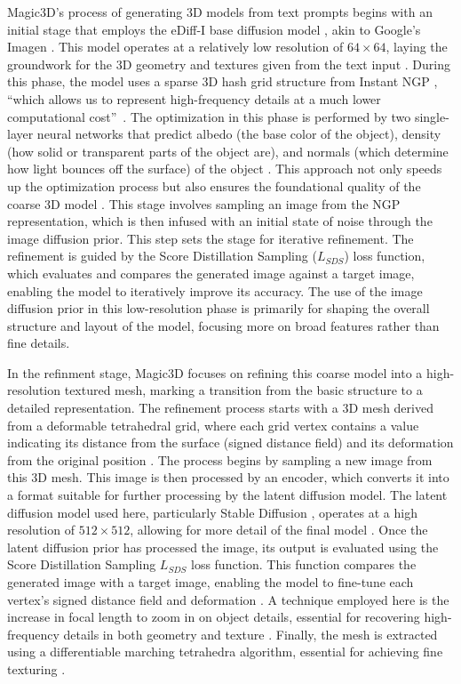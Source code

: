 Magic3D's process of generating 3D models from text prompts begins with an initial stage that employs the eDiff-I base diffusion model \citep{balaji2022eDiff-I}, akin to Google's Imagen \citep{saharia2022imagen}. This model operates at a relatively low resolution of \(64 \times 64\), laying the groundwork for the 3D geometry and textures given from the text input \citep{lin2023magic3d}. During this phase, the model uses a sparse 3D hash grid structure from Instant NGP \citep{mueller2022instant}, ``which allows us to represent high-frequency details at a much lower computational cost''~\citep{lin2023magic3d}. The optimization in this phase is performed by two single-layer neural networks that predict albedo (the base color of the object), density (how solid or transparent parts of the object are), and normals (which determine how light bounces off the surface) of the object \citep{lin2023magic3d}. This approach not only speeds up the optimization process but also ensures the foundational quality of the coarse 3D model \citep{lin2023magic3d}. 
This stage involves sampling an image from the NGP representation, which is then infused with an initial state of noise through the image diffusion prior. This step sets the stage for iterative refinement. The refinement is guided by the Score Distillation Sampling (\(L_{SDS}\)) loss function, which evaluates and compares the generated image against a target image, enabling the model to iteratively improve its accuracy. The use of the image diffusion prior in this low-resolution phase is primarily for shaping the overall structure and layout of the model, focusing more on broad features rather than fine details.

In the refinment stage, Magic3D focuses on refining this coarse model into a high-resolution textured mesh, marking a transition from the basic structure to a detailed representation. The refinement process starts with a 3D mesh derived from a deformable tetrahedral grid, where each grid vertex contains a value indicating its distance from the surface (signed distance field) and its deformation from the original position \citep{shen2021DMTet, lin2023magic3d}. The process begins by sampling a new image from this 3D mesh. This image is then processed by an encoder, which converts it into a format suitable for further processing by the latent diffusion model. The latent diffusion model used here, particularly Stable Diffusion \citep{rombachStableDiffusion}, operates at a high resolution of \(512 \times 512\), allowing for more detail of the final model \citep{lin2023magic3d}. Once the latent diffusion prior has processed the image, its output is evaluated using the Score Distillation Sampling \(L_{SDS}\) loss function. This function compares the generated image with a target image, enabling the model to fine-tune each vertex's signed distance field and deformation \citep{lin2023magic3d}. A technique employed here is the increase in focal length to zoom in on object details, essential for recovering high-frequency details in both geometry and texture \citep{lin2023magic3d}. Finally, the mesh is extracted using a differentiable marching tetrahedra algorithm, essential for achieving fine texturing \citep{lin2023magic3d}.

